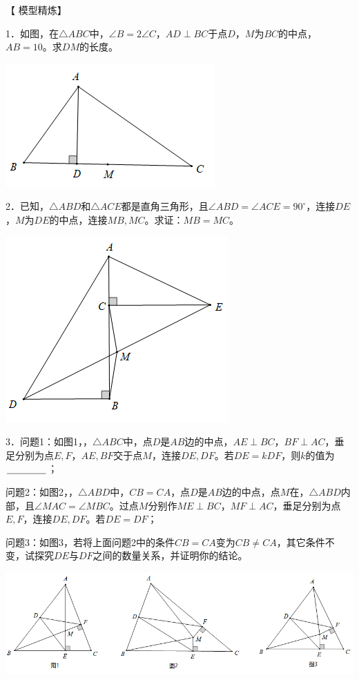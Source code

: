\documentclass[10pt]{ctexart}
\begin{document}
【 {\heiti 模型精炼}】

\begin{shaded}
1．如图，在$\triangle ABC$中，$\angle B=2\angle C$，$AD\perp BC$于点$D$，$M$为$BC$的中点，$AB=10$。求$DM$的长度。
\end{shaded}

\begin{flushright}
	\includegraphics[scale=0.6]{figure/zhongdian17}
\end{flushright}

\begin{shaded}
2．已知，$\triangle ABD$和$\triangle ACE$都是直角三角形，且$\angle
 ABD=\angle ACE=90^\circ$，连接$DE$，$M$为$DE$的中点，连接$MB,MC$。求证：$MB=MC$。
\end{shaded}

\begin{flushright}
	\includegraphics[scale=0.6]{figure/zhongdian18}
\end{flushright}

\begin{shaded}
3．问题1：如图1，，$\triangle ABC$中，点$D$是$AB$边的中点，$AE\perp BC$，$BF\perp AC$，垂足分别为点$E,F$，$AE,BF$交于点$M$，连接$DE,DF$。若$DE=kDF$，则$k$的值为$\underline{\hspace{1.5cm}}$；

问题2：如图2，，$\triangle ABD$中，$CB=CA$，点$D$是$AB$边的中点，点$M$在，$\triangle ABD$内部，且$\angle MAC=\angle MBC$。过点$M$分别作$ME\perp BC$，$MF\perp AC$，垂足分别为点$E,F$，连接$DE,DF$。若$DE=DF$；

问题3：如图3，若将上面问题2中的条件$CB=CA$变为$CB\neq CA$，其它条件不变，试探究$DE$与$DF$之间的数量关系，并证明你的结论。
\end{shaded}

\begin{center}
	\includegraphics[scale=0.6]{figure/zhongdian19}
\end{center}
\end{document}
